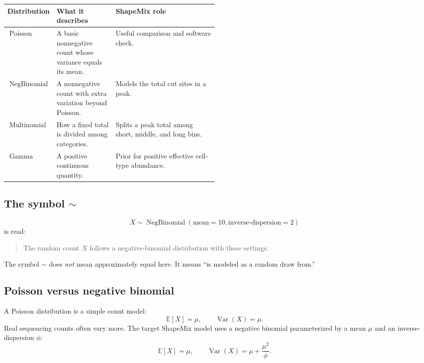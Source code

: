 \documentclass[11pt]{article}
\newcommand{\NB}{\operatorname{NegBinomial}}
\newcommand{\Mult}{\operatorname{Multinomial}}
\newcommand{\Gam}{\operatorname{Gamma}}
\newcommand{\Pois}{\operatorname{Poisson}}
\newcommand{\E}{\mathbb{E}}
\newcommand{\Var}{\operatorname{Var}}
\begin{document}
\begin{center}
\begin{tabularx}{0.96\linewidth}{L{0.22\linewidth}L{0.28\linewidth}X}
\toprule
Distribution & What it describes & ShapeMix role \\
\midrule
\(\Pois\) & A basic nonnegative count whose variance equals its mean. & Useful comparison and software check. \\
\(\NB\) & A nonnegative count with extra variation beyond Poisson. & Models the total cut sites in a peak. \\
\(\Mult\) & How a fixed total is divided among categories. & Splits a peak total among short, middle, and long bins. \\
\(\Gam\) & A positive continuous quantity. & Prior for positive effective cell-type abundance. \\
\bottomrule
\end{tabularx}
\end{center}

\subsection{The symbol \texorpdfstring{\(\sim\)}{tilde}}

\[
X\sim\NB(\text{mean}=10,\text{inverse-dispersion}=2)
\]
is read:

\begin{quote}
The random count \(X\) follows a negative-binomial distribution with these settings.
\end{quote}

The symbol \(\sim\) does \emph{not} mean approximately equal here. It means
“is modeled as a random draw from.”

\subsection{Poisson versus negative binomial}

A Poisson distribution is a simple count model:
\[
\E[X]=\mu,\qquad \Var(X)=\mu.
\]
Real sequencing counts often vary more. The target ShapeMix model uses a negative
binomial parameterized by a mean \(\mu\) and an inverse-dispersion \(\phi\):
\[
\E[X]=\mu,\qquad
\Var(X)=\mu+\frac{\mu^2}{\phi}.
\]
\end{document}
